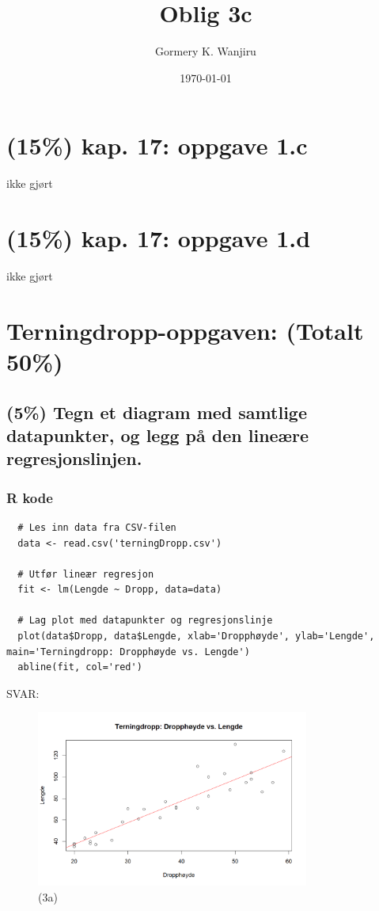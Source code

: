 \documentclass[12pt]{article}
\title{Oblig 3c}
\author{Gormery K. Wanjiru}
\date{\today}
\begin{document}
\maketitle

\newpage
\tableofcontents

\newpage

\section{(15\%) kap. 17: oppgave 1.c}
ikke gjørt

\section{(15\%) kap. 17: oppgave 1.d}
ikke gjørt
\section{Terningdropp-oppgaven: (Totalt 50\%)}
\subsection{(5\%) Tegn et diagram med samtlige datapunkter, og legg på den lineære regresjonslinjen.}
\subsubsection{R kode}
\begin{verbatim}
  # Les inn data fra CSV-filen
  data <- read.csv('terningDropp.csv')
  
  # Utfør lineær regresjon
  fit <- lm(Lengde ~ Dropp, data=data)
  
  # Lag plot med datapunkter og regresjonslinje
  plot(data$Dropp, data$Lengde, xlab='Dropphøyde', ylab='Lengde', main='Terningdropp: Dropphøyde vs. Lengde')
  abline(fit, col='red')  
\end{verbatim}
SVAR:
\begin{figure}[H]
  \centering
  \includegraphics[width=0.8\textwidth]{3a.png}
  \caption{(3a)}
\end{figure}
\end{document}

